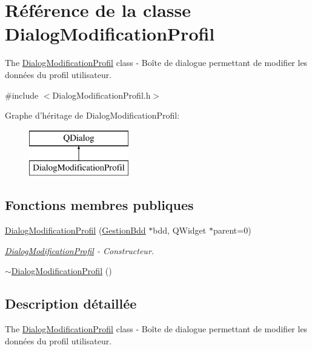 \hypertarget{class_dialog_modification_profil}{\section{Référence de la classe Dialog\-Modification\-Profil}
\label{class_dialog_modification_profil}
}


The \hyperlink{class_dialog_modification_profil}{Dialog\-Modification\-Profil} class -\/ Boîte de dialogue permettant de modifier les données du profil utilisateur.  




{\ttfamily \#include $<$Dialog\-Modification\-Profil.\-h$>$}

Graphe d'héritage de Dialog\-Modification\-Profil\-:\begin{figure}[H]
\begin{center}
\leavevmode
\includegraphics[height=2.000000cm]{class_dialog_modification_profil}
\end{center}
\end{figure}
\subsection*{Fonctions membres publiques}
\begin{DoxyCompactItemize}
\item 
\hyperlink{class_dialog_modification_profil_a700fb3134550ddfa98df89dfca285bb1}{Dialog\-Modification\-Profil} (\hyperlink{class_gestion_bdd}{Gestion\-Bdd} $\ast$bdd, Q\-Widget $\ast$parent=0)
\begin{DoxyCompactList}\small\item\em \hyperlink{class_dialog_modification_profil}{Dialog\-Modification\-Profil} -\/ Constructeur. \end{DoxyCompactList}\item 
\hyperlink{class_dialog_modification_profil_a5f2ede09acd9b01758e4fabe6165e964}{$\sim$\-Dialog\-Modification\-Profil} ()
\end{DoxyCompactItemize}


\subsection{Description détaillée}
The \hyperlink{class_dialog_modification_profil}{Dialog\-Modification\-Profil} class -\/ Boîte de dialogue permettant de modifier les données du profil utilisateur. 

